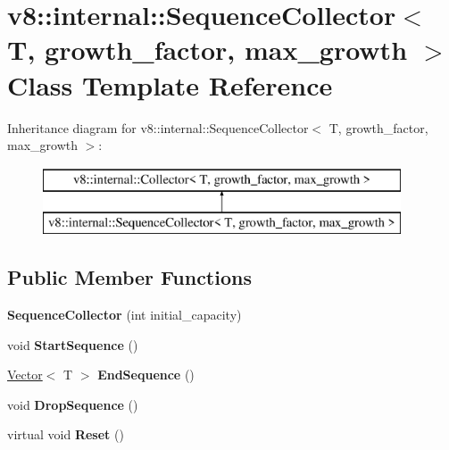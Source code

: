 \hypertarget{classv8_1_1internal_1_1_sequence_collector}{}\section{v8\+:\+:internal\+:\+:Sequence\+Collector$<$ T, growth\+\_\+factor, max\+\_\+growth $>$ Class Template Reference}
\label{classv8_1_1internal_1_1_sequence_collector}
Inheritance diagram for v8\+:\+:internal\+:\+:Sequence\+Collector$<$ T, growth\+\_\+factor, max\+\_\+growth $>$\+:\begin{figure}[H]
\begin{center}
\leavevmode
\includegraphics[height=2.000000cm]{classv8_1_1internal_1_1_sequence_collector}
\end{center}
\end{figure}
\subsection*{Public Member Functions}
\begin{DoxyCompactItemize}
\item 
{\bfseries Sequence\+Collector} (int initial\+\_\+capacity)\hypertarget{classv8_1_1internal_1_1_sequence_collector_aacd053b98186d77b14e4dfc40579d43c}{}\label{classv8_1_1internal_1_1_sequence_collector_aacd053b98186d77b14e4dfc40579d43c}

\item 
void {\bfseries Start\+Sequence} ()\hypertarget{classv8_1_1internal_1_1_sequence_collector_a880a4b89cafb1ebb207002eed168fd03}{}\label{classv8_1_1internal_1_1_sequence_collector_a880a4b89cafb1ebb207002eed168fd03}

\item 
\hyperlink{classv8_1_1internal_1_1_vector}{Vector}$<$ T $>$ {\bfseries End\+Sequence} ()\hypertarget{classv8_1_1internal_1_1_sequence_collector_a9f9ca468a39096e8d4db2ea4f8c9752b}{}\label{classv8_1_1internal_1_1_sequence_collector_a9f9ca468a39096e8d4db2ea4f8c9752b}

\item 
void {\bfseries Drop\+Sequence} ()\hypertarget{classv8_1_1internal_1_1_sequence_collector_a1463c63b307d6d9a5633425b72a7a058}{}\label{classv8_1_1internal_1_1_sequence_collector_a1463c63b307d6d9a5633425b72a7a058}

\item 
virtual void {\bfseries Reset} ()\hypertarget{classv8_1_1internal_1_1_sequence_collector_a7474c0128d73ccc822f14f0ebb9a39f8}{}\label{classv8_1_1internal_1_1_sequence_collector_a7474c0128d73ccc822f14f0ebb9a39f8}

\end{DoxyCompactItemize}
